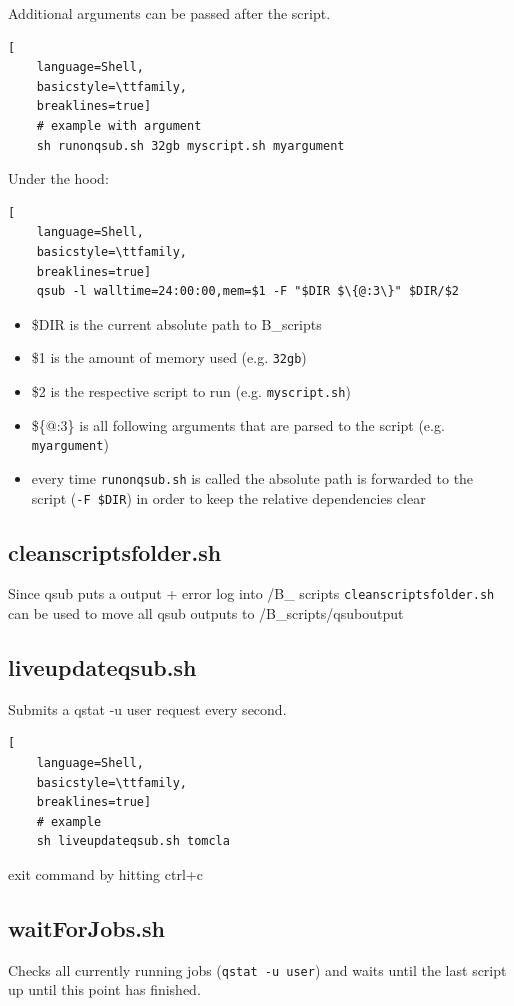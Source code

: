 \documentclass[12pt,a4paper]{scrartcl}
\begin{document}
\noindent Additional arguments can be passed after the script.\\
\begin{lstlisting}[
    language=Shell,
    basicstyle=\ttfamily,
    breaklines=true]
    # example with argument
    sh runonqsub.sh 32gb myscript.sh myargument
\end{lstlisting}
\noindent Under the hood:
\begin{lstlisting}[
    language=Shell,
    basicstyle=\ttfamily,
    breaklines=true]
    qsub -l walltime=24:00:00,mem=$1 -F "$DIR $\{@:3\}" $DIR/$2
\end{lstlisting}
\begin{itemize}
\item \$DIR is the current absolute path to B\_scripts
\item \$1 is the amount of memory used (e.g. \texttt{32gb})
\item \$2 is the respective script to run (e.g. \texttt{myscript.sh})
\item \$\{@:3\} is all following arguments that are parsed to the script (e.g. \texttt{myargument})
\item every time \texttt{runonqsub.sh} is called the absolute path is forwarded to the script (\texttt{-F \$DIR}) in order to keep the relative dependencies clear
\end{itemize}

\subsection{cleanscriptsfolder.sh}
Since qsub puts a output + error log into /B\_ scripts \texttt{cleanscriptsfolder.sh} can be used to move all qsub outputs to /B\_scripts/qsuboutput\\

\subsection{liveupdateqsub.sh}
Submits a qstat -u user request every second.
\begin{lstlisting}[
    language=Shell,
    basicstyle=\ttfamily,
    breaklines=true]
    # example
    sh liveupdateqsub.sh tomcla
\end{lstlisting}

\noindent exit command by hitting ctrl+c

\subsection{waitForJobs.sh}
Checks all currently running jobs (\texttt{qstat -u user}) and waits until the last script up until this point has finished.
\end{document}
